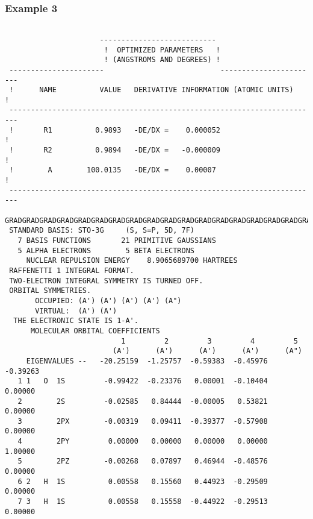 \subsubsection{\sf Example 3}
{\small
\begin{verbatim}

                      ---------------------------
                       !  OPTIMIZED PARAMETERS   !
                       ! (ANGSTROMS AND DEGREES) !
 ----------------------                           -----------------------
 !      NAME          VALUE   DERIVATIVE INFORMATION (ATOMIC UNITS)     !
 ------------------------------------------------------------------------
 !       R1          0.9893   -DE/DX =    0.000052                      !
 !       R2          0.9894   -DE/DX =   -0.000009                      !
 !        A        100.0135   -DE/DX =    0.00007                       !
 ------------------------------------------------------------------------
 GRADGRADGRADGRADGRADGRADGRADGRADGRADGRADGRADGRADGRADGRADGRADGRADGRADGRAD
 STANDARD BASIS: STO-3G     (S, S=P, 5D, 7F)
   7 BASIS FUNCTIONS       21 PRIMITIVE GAUSSIANS
   5 ALPHA ELECTRONS        5 BETA ELECTRONS
     NUCLEAR REPULSION ENERGY    8.9065689700 HARTREES
 RAFFENETTI 1 INTEGRAL FORMAT.
 TWO-ELECTRON INTEGRAL SYMMETRY IS TURNED OFF.
 ORBITAL SYMMETRIES.
       OCCUPIED: (A') (A') (A') (A') (A")
       VIRTUAL:  (A') (A')
  THE ELECTRONIC STATE IS 1-A'.
      MOLECULAR ORBITAL COEFFICIENTS
                           1         2         3         4         5
                         (A')      (A')      (A')      (A')      (A")
     EIGENVALUES --   -20.25159  -1.25757  -0.59383  -0.45976  -0.39263
   1 1   O  1S         -0.99422  -0.23376   0.00001  -0.10404   0.00000
   2        2S         -0.02585   0.84444  -0.00005   0.53821   0.00000
   3        2PX        -0.00319   0.09411  -0.39377  -0.57908   0.00000
   4        2PY         0.00000   0.00000   0.00000   0.00000   1.00000
   5        2PZ        -0.00268   0.07897   0.46944  -0.48576   0.00000
   6 2   H  1S          0.00558   0.15560   0.44923  -0.29509   0.00000
   7 3   H  1S          0.00558   0.15558  -0.44922  -0.29513   0.00000
\end{verbatim}
}
\newpage
